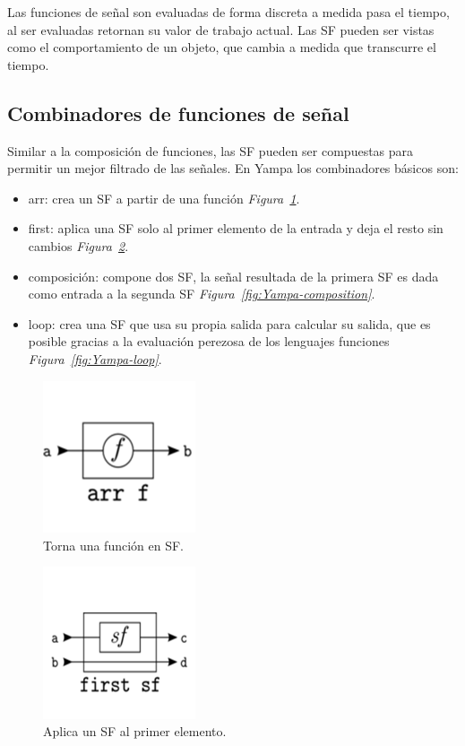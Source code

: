 Las funciones de señal son evaluadas de forma discreta a medida pasa el tiempo, al ser evaluadas retornan su valor de trabajo actual. Las SF pueden ser vistas como el comportamiento de un objeto, que cambia a medida que transcurre el tiempo.

\subsection{Combinadores de funciones de señal}

Similar a la composición de funciones, las SF pueden ser compuestas para permitir un mejor filtrado de las señales. En Yampa los combinadores básicos son:

\begin{itemize}
\item arr: crea un SF a partir de una función \emph{Figura~\ref{fig:Yampa-arr}}.
\item first: aplica una SF solo al primer elemento de la entrada y deja el resto sin cambios \emph{Figura~\ref{fig:Yampa-first}}.
\item composición: compone dos SF, la señal resultada de la primera SF es dada como entrada a la segunda SF \emph{Figura~\ref{fig:Yampa-composition}}.
\item loop: crea una SF que usa su propia salida para calcular su salida, que es posible gracias a la evaluación perezosa de los lenguajes funciones \emph{Figura~\ref{fig:Yampa-loop}}.
\end{itemize}


\begin{figure}[htbp!]
\centering
\includegraphics[width=0.4\textwidth]{Yampa-arr}
\caption[Yampa-arr]{Torna una función en SF.}
\label{fig:Yampa-arr}
\end{figure}

\begin{figure}[htbp!]
\centering
\includegraphics[width=0.4\textwidth]{Yampa-first}
\caption[Yampa-first]{Aplica un SF al primer elemento.}
\label{fig:Yampa-first}
\end{figure}

